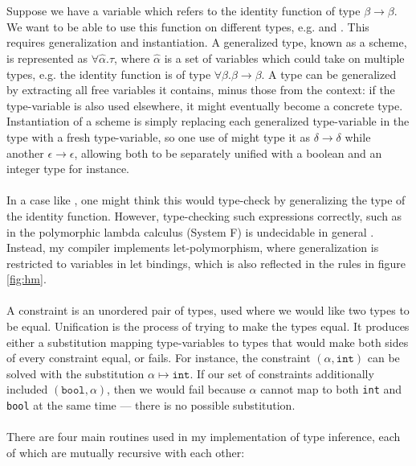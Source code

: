 \\\\
Suppose we have a variable  which refers to the identity function  of type $\beta \rightarrow \beta$. We want to be able to use this function on different types, e.g.  and . This requires generalization and instantiation. A generalized type, known as a scheme, is represented as $\forall \hat{\alpha}. \tau$, where $\hat{\alpha}$ is a set of variables which could take on multiple types, e.g. the identity function is of type $\forall \beta. \beta \rightarrow \beta$. A type can be generalized by extracting all free variables it contains, minus those from the context: if the type-variable is also used elsewhere, it might eventually become a concrete type. Instantiation of a scheme is simply replacing each generalized type-variable in the type with a fresh type-variable, so one use of  might type it as $\delta \rightarrow \delta$ while another $\epsilon \rightarrow \epsilon$, allowing both to be separately unified with a boolean and an integer type for instance.
\\\\
In a case like , one might think this would type-check by generalizing the type of the identity function. However, type-checking such expressions correctly, such as in the polymorphic lambda calculus (System F) is undecidable in general \cite{SystemFUndecidable}. Instead, my compiler implements let-polymorphism, where generalization is restricted to variables in let bindings, which is also reflected in the rules in figure \ref{fig:hm}.
\\\\
A constraint is an unordered pair of types, used where we would like two types to be equal. Unification is the process of trying to make the types equal. It produces either a substitution mapping type-variables to types that would make both sides of every constraint equal, or fails. For instance, the constraint $(\alpha, \texttt{int})$ can be solved with the substitution $\alpha \mapsto \texttt{int}$. If our set of constraints additionally included $(\texttt{bool}, \alpha)$, then we would fail because $\alpha$ cannot map to both \texttt{int} and \texttt{bool} at the same time --- there is no possible substitution.
\\\\
There are four main routines used in my implementation of type inference, each of which are mutually recursive with each other:
